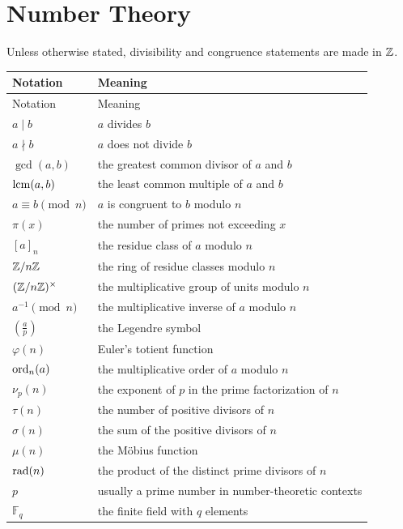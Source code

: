     \section*{Number Theory}

    Unless otherwise stated, divisibility and congruence statements are made in
    $\mathbb{Z}$.

    \vspace{0.5em}

    {\small
    \renewcommand{\arraystretch}{1.18}
    \begin{longtable}{@{}L{0.27\textwidth}L{0.65\textwidth}@{}}
        \toprule
        Notation & Meaning \\
        \midrule
        \endfirsthead

        \toprule
        Notation & Meaning \\
        \midrule
        \endhead

        \bottomrule
        \endlastfoot

        $a\mid b$ & $a$ divides $b$ \\
        $a\nmid b$ & $a$ does not divide $b$ \\
        $\gcd(a,b)$ & the greatest common divisor of $a$ and $b$ \\
        $\operatorname{lcm}(a,b)$ & the least common multiple of $a$ and $b$ \\
        $a\equiv b\pmod n$ & $a$ is congruent to $b$ modulo $n$ \\
        $\pi(x)$ & the number of primes not exceeding $x$ \\
        $[a]_n$ & the residue class of $a$ modulo $n$ \\
        $\mathbb{Z}/n\mathbb{Z}$ & the ring of residue classes modulo $n$ \\
        $(\mathbb{Z}/n\mathbb{Z})^\times$ & the multiplicative group of units modulo $n$ \\
        $a^{-1}\pmod n$ & the multiplicative inverse of $a$ modulo $n$ \\
        $\left(\frac{a}{p}\right)$ & the Legendre symbol \\
        $\varphi(n)$ & Euler's totient function \\
        $\operatorname{ord}_n(a)$ & the multiplicative order of $a$ modulo $n$ \\
        $\nu_p(n)$ & the exponent of $p$ in the prime factorization of $n$ \\
        $\tau(n)$ & the number of positive divisors of $n$ \\
        $\sigma(n)$ & the sum of the positive divisors of $n$ \\
        $\mu(n)$ & the M\"obius function \\
        $\operatorname{rad}(n)$ & the product of the distinct prime divisors of $n$ \\
        $p$ & usually a prime number in number-theoretic contexts \\
        $\mathbb{F}_q$ & the finite field with $q$ elements \\
    \end{longtable}
    }

